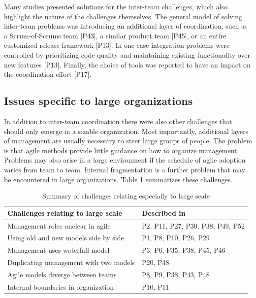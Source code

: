 Many studies presented solutions for the inter-team challenges, which also
highlight the nature of the challenges themselves. The general model of solving
inter-team problems was introducing an additional layer of coordination, such as
a Scrum-of-Scrums team [P43], a similar product team [P45], or an entire
customized release framework [P13]. In one case integration problems were
controlled by prioritizing code quality and maintaining existing functionality
over new features [P13]. Finally, the choice of tools was reported to have an
impact on the coordination effort [P17].



\subsection{Issues specific to large organizations}

In addition to inter-team coordination there were also other challenges that
should only emerge in a sizable organization.
Most importantly, additional layers of management are usually necessary to steer
large groups of people. The problem is that agile methods provide little
guidance on how to organize management.
Problems may also arise in a large environment if the schedule of agile adoption
varies from team to team. Internal fragmentation is a further problem that may
be encountered in large organizations.
Table \ref{table:challenges_largescale} summarizes these challenges.

\begin{table}[t]
    \centering
    \begin{tabular}{ >{\raggedright\arraybackslash}p{}
                     >{\raggedright\arraybackslash}p{} }
        \toprule
        Challenges relating to large scale  &  Described in \\
        \midrule
        Management roles unclear in agile       &  P2, P11, P27, P30, P38, P49, P52 \\
        Using old and new models side by side   &  P1, P8, P10, P26, P29 \\
        Management uses waterfall model         &  P3, P6, P35, P38, P45, P46 \\
        Duplicating management with two models  &  P20, P48 \\
        Agile models diverge between teams      &  P8, P9, P38, P43, P48 \\
        Internal boundaries in organization     &  P10, P11 \\
        \bottomrule
    \end{tabular}
    \caption{Summary of challenges relating especially to large scale}
    \label{table:challenges_largescale}
\end{table}

